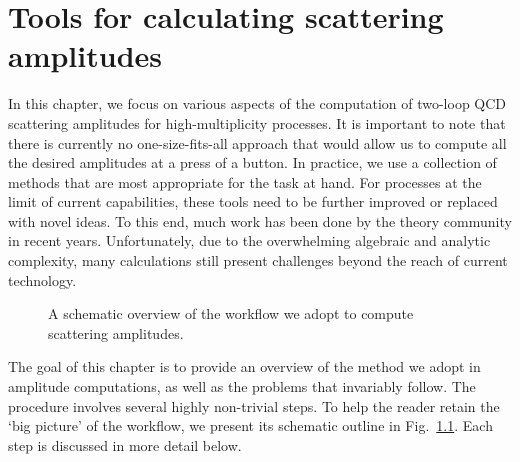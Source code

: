 \documentclass[main.tex]{subfiles}
\begin{document}
\chapter{Tools for calculating scattering amplitudes} \label{sec:tools}
In this chapter, we focus on various aspects of the computation of two-loop QCD scattering amplitudes for high-multiplicity processes. It is important to note that there is currently no one-size-fits-all approach that would allow us to compute all the desired amplitudes at a press of a button. In practice, we use a collection of methods that are most appropriate for the task at hand. For processes at the limit of current capabilities, these tools need to be further improved or replaced with novel ideas. To this end, much work has been done by the theory community in recent years. Unfortunately, due to the overwhelming algebraic and analytic complexity, many calculations still present challenges beyond the reach of current technology. 
\begin{figure}[t]
\caption{A schematic overview of the workflow we adopt to compute scattering amplitudes.}
\label{fig:outline}
\end{figure}
The goal of this chapter is to provide an overview of the method we adopt in amplitude computations, as well as the problems that invariably follow. The procedure involves several highly non-trivial steps. To help the reader retain the `big picture' of the workflow, we present its schematic outline in Fig.~\ref{fig:outline}.  Each step is discussed in more detail below. 
\end{document}
